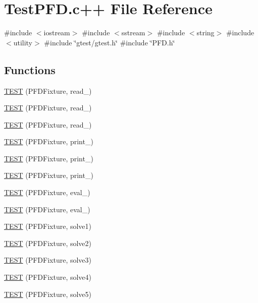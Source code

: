 \hypertarget{TestPFD_8c_09_09}{\section{\-Test\-P\-F\-D.\-c++ \-File \-Reference}
\label{TestPFD_8c_09_09}
}
{\ttfamily \#include $<$iostream$>$}\*
{\ttfamily \#include $<$sstream$>$}\*
{\ttfamily \#include $<$string$>$}\*
{\ttfamily \#include $<$utility$>$}\*
{\ttfamily \#include \char`\"{}gtest/gtest.\-h\char`\"{}}\*
{\ttfamily \#include \char`\"{}\-P\-F\-D.\-h\char`\"{}}\*
\subsection*{\-Functions}
\begin{DoxyCompactItemize}
\item 
\hyperlink{TestPFD_8c_09_09_ae2ceeb6270e4c46f9184f444c9a18803}{\-T\-E\-S\-T} (\-P\-F\-D\-Fixture, read\-\_)
\item 
\hyperlink{TestPFD_8c_09_09_a7cbb6f2592992b1e2738ac30bd9b3179}{\-T\-E\-S\-T} (\-P\-F\-D\-Fixture, read\-\_)
\item 
\hyperlink{TestPFD_8c_09_09_ad4d893008beebcf263d3cc3d02700f98}{\-T\-E\-S\-T} (\-P\-F\-D\-Fixture, read\-\_)
\item 
\hyperlink{TestPFD_8c_09_09_aeb73c70e967605680ad0fd952404723a}{\-T\-E\-S\-T} (\-P\-F\-D\-Fixture, print\-\_)
\item 
\hyperlink{TestPFD_8c_09_09_a7f9a79749e850d18f5ce2dd840bcd811}{\-T\-E\-S\-T} (\-P\-F\-D\-Fixture, print\-\_)
\item 
\hyperlink{TestPFD_8c_09_09_a9e20949b00d611069dcdcdc5d2cb7f0d}{\-T\-E\-S\-T} (\-P\-F\-D\-Fixture, print\-\_)
\item 
\hyperlink{TestPFD_8c_09_09_a19c5ff94969bb3a46858e6bf9cbe1776}{\-T\-E\-S\-T} (\-P\-F\-D\-Fixture, eval\-\_)
\item 
\hyperlink{TestPFD_8c_09_09_ab68afb0eeb95c024738a36ae7ff8fc18}{\-T\-E\-S\-T} (\-P\-F\-D\-Fixture, eval\-\_)
\item 
\hyperlink{TestPFD_8c_09_09_a306e0708d1b40dc0bb6011c54592bb4b}{\-T\-E\-S\-T} (\-P\-F\-D\-Fixture, solve1)
\item 
\hyperlink{TestPFD_8c_09_09_a59ac4582d4de7779e8b0bf613da62882}{\-T\-E\-S\-T} (\-P\-F\-D\-Fixture, solve2)
\item 
\hyperlink{TestPFD_8c_09_09_a406763214f82c55c0dcdf7bd737bfc37}{\-T\-E\-S\-T} (\-P\-F\-D\-Fixture, solve3)
\item 
\hyperlink{TestPFD_8c_09_09_aaa2c8642e29a54997f2c526af11097ad}{\-T\-E\-S\-T} (\-P\-F\-D\-Fixture, solve4)
\item 
\hyperlink{TestPFD_8c_09_09_adcd0428f697060e4ecc74f5d600969fb}{\-T\-E\-S\-T} (\-P\-F\-D\-Fixture, solve5)
\end{DoxyCompactItemize}


